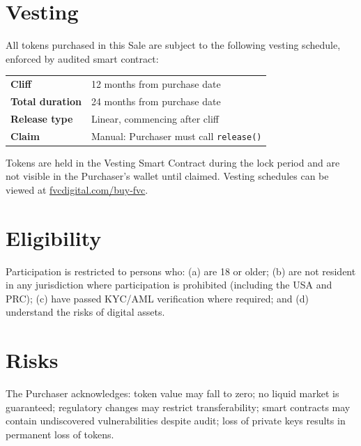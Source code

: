 \documentclass[11pt,a4paper]{article}
\begin{document}
\section{Vesting}

All tokens purchased in this Sale are subject to the following vesting schedule, enforced by audited smart contract:

\vspace{0.5em}
\begin{center}
\begin{tabular}{>{\bfseries}l l}
\toprule
Cliff & 12 months from purchase date \\
Total duration & 24 months from purchase date \\
Release type & Linear, commencing after cliff \\
Claim & Manual: Purchaser must call \texttt{release()} \\
\bottomrule
\end{tabular}
\end{center}
\vspace{0.5em}

Tokens are held in the Vesting Smart Contract during the lock period and are not visible in the Purchaser's wallet until claimed. Vesting schedules can be viewed at \href{https://fvcdigital.com/buy-fvc}{fvcdigital.com/buy-fvc}.

\section{Eligibility}

Participation is restricted to persons who: (a) are 18 or older; (b) are not resident in any jurisdiction where participation is prohibited (including the USA and PRC); (c) have passed KYC/AML verification where required; and (d) understand the risks of digital assets.

\section{Risks}

The Purchaser acknowledges: token value may fall to zero; no liquid market is guaranteed; regulatory changes may restrict transferability; smart contracts may contain undiscovered vulnerabilities despite audit; loss of private keys results in permanent loss of tokens.
\end{document}

